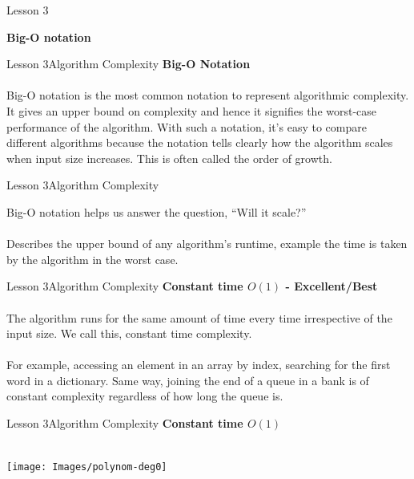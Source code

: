 \documentclass[aspectratio=1610]{beamer}
\begin{document}
\begin{frame}{Lesson 3}{}
\begin{center}
\huge \textbf{Big-O notation}
\end{center}
\end{frame}


\begin{frame}{Lesson 3}{Algorithm Complexity}
\LARGE
\textbf{Big-O Notation}\\~\\
\Large
Big-O notation is the most common notation to represent algorithmic complexity. 
It gives an upper bound on complexity and hence it signifies the worst-case
performance of the algorithm. With such a notation, it's easy to compare different
algorithms because the notation tells clearly how the algorithm scales when 
input size increases. This is often called the order of growth.
\end{frame}


\begin{frame}{Lesson 3}{Algorithm Complexity}
\begin{center}
\huge Big-O notation helps us answer the question, “Will it scale?”\\~\\
\Large 
Describes the upper bound of any algorithm’s runtime, example the time is taken by
the algorithm in the worst case.
\end{center}
\end{frame}


\begin{frame}{Lesson 3}{Algorithm Complexity}
\LARGE
\textbf{Constant time $O(1)$ - Excellent/Best}\\~\\
The algorithm runs for the same amount of time every time irrespective of the
input size. We call this, constant time complexity.\\~\\
\Large
For example, accessing an element in an array by index, searching for the first
word in a dictionary. Same way, joining the end of a queue in a bank is of
constant complexity regardless of how long the queue is.
\end{frame}


\begin{frame}{Lesson 3}{Algorithm Complexity}
\LARGE
\textbf{Constant time $O(1)$}\\~\\
\begin{center}
\texttt{[image: Images/polynom-deg0]}
\end{center}
\end{frame}
\end{document}
